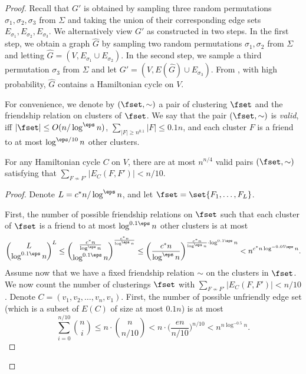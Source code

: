 \begin{proof}
Recall that $G'$ is obtained by sampling three random permutations $\sigma_1,\sigma_2,\sigma_3$ from $\Sigma$ and taking the union of their corresponding edge sets $E_{\sigma_1}, E_{\sigma_2}, E_{\sigma_3}$. We alternatively view $G'$ as constructed in two steps. In the first step, we obtain a graph $\hat G$ by sampling two random permutations $\sigma_1,\sigma_2$ from $\Sigma$ and letting $\hat G=(V,E_{\sigma_1}\cup E_{\sigma_2})$. In the second step, we sample a third permutation $\sigma_3$ from $\Sigma$ and let $G'=(V, E(\hat G)\cup E_{\sigma_3})$.
From , with high probability, $\hat G$ contains a Hamiltonian cycle on $V$.

    For convenience, we denote by $(\fset,\sim)$ a pair of clustering $\fset$ and the friendship relation on clusters of $\fset$. We say that the pair $(\fset,\sim)$ is \emph{valid}, iff $|\fset|\le O(n/\log^{\eps} n)$, $\sum_{|F|\ge n^{0.1}}|F|\le 0.1n$, and each cluster $F$ is a friend to at most $\log^{\eps/10} n$ other clusters.

\begin{claim}
\label{clm: number of partition}
For any Hamiltonian cycle $C$ on $V$, there are at most $n^{n/4}$ valid pairs $(\fset,\sim)$ satisfying that $\sum_{F\not\sim F'}|E_{C}(F,F')| < n/10$.
\end{claim}
\begin{proof}
Denote $L=c^*n/\log^{\eps} n$,
and let $\fset=\set{F_1,\ldots,F_L}$.

First, the number of possible friendship relations on $\fset$ such that each cluster of $\fset$ is a friend to at most $\log^{0.1\eps} n$ other clusters is at most 
$$
\binom{L}{\log^{0.1\eps} n}^L\le 
\binom{\frac{c^*n}{\log^{\eps} n}}{\log^{0.1\eps} n} ^{\frac{c^*n}{\log^{\eps} n}} \le \bigg(\frac{c^*n}{\log^{\eps} n}\bigg)^{\frac{c^*n}{\log^{\eps} n}\cdot \log^{0.1\eps} n}<  n^{c^*n \log^{-0.05\eps} n}.
$$
Assume now that we have a fixed friendship relation $\sim$ on the clusters in $\fset$. We now count the number of clusterings $\fset$ with $\sum_{F\not\sim F'}|E_{C}(F,F')| < n/10$.
Denote $C=(v_1, v_2, \ldots, v_n,v_1)$. 
First, the number of possible unfriendly edge set (which is a subset of $E(C)$ of size at most $0.1n$) is at most
$$\sum_{i=0}^{n/10} \binom{n}{i} \le n \cdot \binom{n}{n/10} < n\cdot \bigg(\frac{en}{n/10}\bigg)^{n/10} < n^{n \log^{-0.5}n}.$$


\end{proof}
\end{proof}
